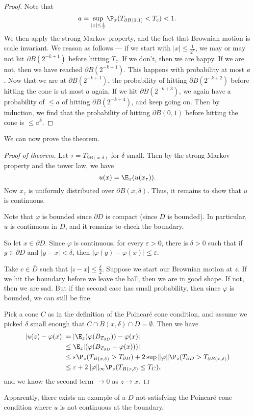 \documentclass[a4paper]{article}
\begin{document}
\begin{proof}
  Note that
  \[
    a = \sup_{|x| \leq \frac{1}{2}} \P_x(T_{\partial B(0, 1)} < T_c) < 1.
  \]
  We then apply the strong Markov property, and the fact that Brownian motion is scale invariant. We reason as follows --- if we start with $|x| \leq \frac{1}{2^k}$, we may or may not hit $\partial B(2^{-k + 1})$ before hitting $T_c$. If we don't, then we are happy. If we are not, then we have reached $\partial B(2^{-k + 1})$. This happens with probability at most $a$. Now that we are at $\partial B(2^{-k + 1})$, the probability of hitting $\partial B(2^{-k + 2})$ before hitting the cone is at most $a$ again. If we hit $\partial B(2^{-k + 3})$, we again have a probability of $\leq a$ of hitting $\partial B(2^{-k + 4})$, and keep going on. Then by induction, we find that the probability of hitting $\partial B(0, 1)$ before hitting the cone is $\leq a^k$.
\end{proof}

We can now prove the theorem.
\begin{proof}[Proof of theorem]
  Let $\tau = T_{\partial B(x, \delta)}$ for $\delta$ small. Then by the strong Markov property and the tower law, we have
  \[
    u(x) = \E_x(u(x_\tau)).
  \]
  Now $x_\tau$ is uniformly distributed over $\partial B(x, \delta)$. Thus, it remains to show that $u$ is continuous.

  Note that $\varphi$ is bounded since $\partial D$ is compact (since $D$ is bounded). In particular, $u$ is continuous in $D$, and it remains to check the boundary.

  So let $x \in \partial D$. Since $\varphi$ is continuous, for every $\varepsilon > 0$, there is $\delta > 0$ such that if $y \in \partial D$ and $|y - x| < \delta$, then $|\varphi(y) - \varphi(x)| \leq \varepsilon$.

  Take $c \in \bar{D}$ such that $|z - x| \leq \frac{\delta}{2}$. Suppose we start our Brownian motion at $z$. If we hit the boundary before we leave the ball, then we are in good shape. If not, then we are sad. But if the second case has small probability, then since $\varphi$ is bounded, we can still be fine.

  Pick a cone $C$ as in the definition of the Poincar\'e cone condition, and assume we picked $\delta$ small enough that $C \cap B(x, \delta) \cap D = \emptyset$. Then we have
  \begin{align*}
    |u(z) - \varphi(x)| &= |\E_z(\varphi(B_{T_{\partial D}})) - \varphi(x)|\\
    &\leq \E_z |(\varphi(B_{T_{\partial D}} - \varphi(x)))|\\
    &\leq \varepsilon \P_z(T_{B(x, \delta)} > T_{\partial D}) + 2 \sup \|\varphi\| \P_z(T_{\partial D} > T_{\partial B(x, \delta)})\\
    &\leq \varepsilon + 2 \|\varphi\|_{\infty} \P_z(T_{B(x, \delta)} \leq T_C),
  \end{align*}
  and we know the second term $\to 0$ as $z \to x$.
\end{proof}
Apparently, there exists an example of a $D$ not satisfying the Poincar\'e cone condition where $u$ is not continuous at the boundary.
\end{document}
